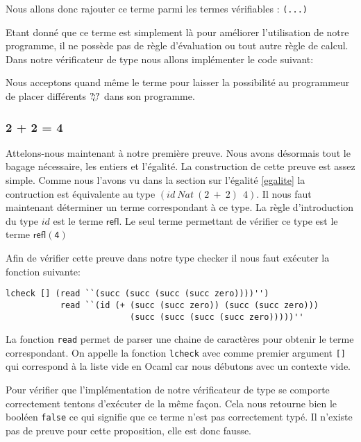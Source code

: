 \documentclass {article}
\newcommand{\codefrom}[3]
           {}
\theoremstyle{definition}
\theoremstyle{remark}
\newcommand{\fun}[1]{\lstinline!#1!}
\begin{document}
Nous allons donc rajouter ce terme parmi les termes vérifiables :
\codefrom{dependent}{lambda}{inTm_head} \lstinline!(...)!
\codefrom{dependent}{lambda}{what}

Etant donné que ce terme est simplement là pour améliorer l'utilisation de notre programme,
il ne possède pas de règle d'évaluation ou tout autre règle de calcul.
Dans notre vérificateur de type nous allons implémenter le code suivant:

\codefrom{dependent}{lambda}{check_what}

Nous acceptons quand même le terme pour laisser la possibilité au programmeur de placer différents $\text{?\!?`\!?}$ dans son programme.





\subsubsection{2 + 2 = 4}

\newcommand{\refl}{\ensuremath{\mathsf{refl}}}
\newcommand{\refls}[1]{\ensuremath{\mathsf{refl(#1)}}}

Attelons-nous maintenant à notre première preuve. Nous avons désormais tout le bagage nécessaire, 
les entiers et l'égalité.
La construction de cette preuve est assez simple. Comme nous l'avons vu dans la section
sur l'égalité \ref{egalite} la contruction  est équivalente  au type  $(id\: Nat\: (2\: +\: 2)\:\: 4)$.
Il nous faut maintenant déterminer un terme correspondant à ce type. La règle d'introduction
du type $id$ est le terme \refl . Le seul terme permettant de vérifier ce type
est le terme \refls{4}


Afin de vérifier cette preuve dans notre type checker il nous faut exécuter la fonction suivante: 

\begin{lstlisting} 
lcheck [] (read ``(succ (succ (succ (succ zero))))'') 
           read ``(id (+ (succ (succ zero)) (succ (succ zero))) 
                         (succ (succ (succ (succ zero)))))''
\end{lstlisting} 

La fonction \fun{read} permet de parser une chaine de caractères pour obtenir le terme correspondant.
On appelle la fonction \fun{lcheck} avec comme premier argument \fun{[]} qui correspond à la liste vide en Ocaml
car nous débutons avec un contexte vide.

Pour vérifier que l'implémentation de notre vérificateur de type se comporte correctement tentons 
d'exécuter  de la même façon. Cela nous retourne bien le booléen \fun{false} ce qui signifie que 
ce terme n'est pas correctement typé. Il n'existe pas de preuve pour cette proposition, elle est donc fausse.
\end{document}
